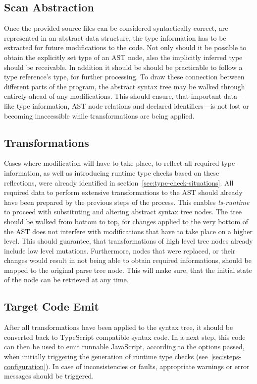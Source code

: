 \subsection{Scan Abstraction}

Once the provided source files can be considered syntactically correct, are represented in an abstract data structure, the type information has to be extracted for future modifications to the code. Not only should it be possible to obtain the explicitly set type of an AST node, also the implicitly inferred type should be receivable. In addition it should be should be practicable to follow a type reference's type, for further processing. To draw these connection between different parts of the program, the abstract syntax tree may be walked through entirely ahead of any modifications. This should ensure, that important data---like type information, AST node relations and declared identifiers---is not lost or becoming inaccessible while transformations are being applied.

\subsection{Transformations}

Cases where modification will have to take place, to reflect all required type information, as well as introducing runtime type checks based on these reflections, were already identified in section~\ref{sec:type-check-situations}. All required data to perform extensive transformations to the AST should already have been prepared by the previous steps of the process. This enables \emph{ts-runtime} to proceed with substituting and altering abstract syntax tree nodes. The tree should be walked from bottom to top, for changes applied to the very bottom of the AST does not interfere with modifications that have to take place on a higher level. This should guarantee, that transformations of high level tree nodes already include low level mutations. Furthermore, nodes that were replaced, or their changes would result in not being able to obtain required informations, should be mapped to the original parse tree node. This will make sure, that the initial state of the node can be retrieved at any time.

\subsection{Target Code Emit}

After all transformations have been applied to the syntax tree, it should be converted back to TypeScript compatible syntax code. In a next step, this code can then be used to emit runnable JavaScript, according to the options passed, when initially triggering the generation of runtime type checks (see~\ref{sec:steps-configuration}). In case of inconsistencies or faults, appropriate warnings or error messages should be triggered.

